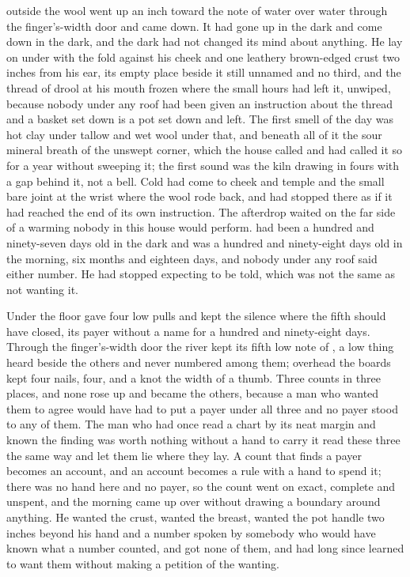 
 outside the wool went up an inch toward the note of water over water through the finger's-width door and came down. It had gone up in the dark and come down in the dark, and the dark had not changed its mind about anything. He lay on  under  with the fold against his cheek and one leathery brown-edged crust two inches from his ear, its empty place beside it still unnamed and no third, and the thread of drool at his mouth frozen where the small hours had left it, unwiped, because nobody under any roof had been given an instruction about the thread and a basket set down is a pot set down and left. The first smell of the day was hot clay under tallow and wet wool under that, and beneath all of it the sour mineral breath of the unswept corner, which the house called  and had called it so for a year without sweeping it; the first sound was the kiln drawing in fours with a gap behind it, not a bell. Cold had come to cheek and temple and the small bare joint at the wrist where the wool rode back, and had stopped there as if it had reached the end of its own instruction. The afterdrop waited on the far side of a warming nobody in this house would perform.  had been a hundred and ninety-seven days old in the dark and was a hundred and ninety-eight days old in the morning, six months and eighteen days, and nobody under any roof said either number. He had stopped expecting to be told, which was not the same as not wanting it.

\scenebreak

Under the floor  gave four low pulls and kept the silence where the fifth should have closed, its payer without a name for a hundred and ninety-eight days. Through the finger's-width door the river kept its fifth low note of , a low thing heard beside the others and never numbered among them; overhead the boards kept four nails, four, and a knot the width of a thumb. Three counts in three places, and none rose up and became the others, because a man who wanted them to agree would have had to put a payer under all three and no payer stood to any of them. The man who had once read a chart by its neat margin and known the finding was worth nothing without a hand to carry it read these three the same way and let them lie where they lay. A count that finds a payer becomes an account, and an account becomes a rule with a hand to spend it; there was no hand here and no payer, so the count went on exact, complete and unspent, and the morning came up over  without drawing a boundary around anything. He wanted the crust, wanted the breast, wanted the pot handle two inches beyond his hand and a number spoken by somebody who would have known what a number counted, and got none of them, and had long since learned to want them without making a petition of the wanting.

